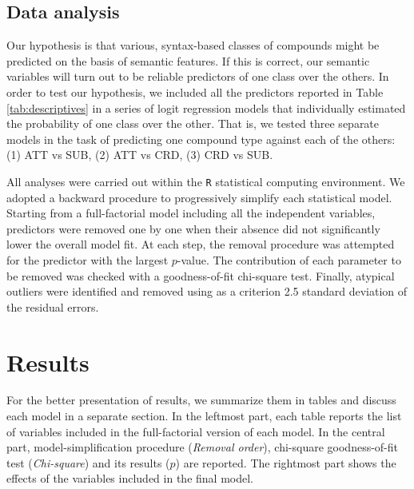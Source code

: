 \documentclass[output=paper]{langsci/langscibook}
\begin{document}
\subsection{Data analysis}


Our hypothesis is that various, syntax-based classes of compounds might be predicted on the basis of semantic features. If this is correct, our semantic variables will turn out to be reliable predictors of one class over the others. In order to test our hypothesis, we included all the predictors reported in Table \ref{tab:descriptives} in a series of logit regression models that individually estimated the probability of one class over the other. That is, we tested three separate models in the task of predicting one compound type against each of the others: (1) ATT vs SUB, (2) ATT vs CRD, (3) CRD vs SUB.

All analyses were carried out within the \texttt{R} statistical computing environment. We adopted a backward procedure to progressively simplify each statistical mod\-el. Starting from a full-factorial model including all the independent variables, predictors were removed one by one when their absence did not significantly lower the overall model fit. At each step, the removal procedure was attempted for the predictor with the largest $p$-value. The contribution of each parameter to be removed was checked with a goodness-of-fit chi-square test. Finally, atypical outliers were identified and removed using as a criterion 2.5 standard deviation of the residual errors.


\section{Results}
\label{sec:results}


For the better presentation of results, we summarize them in tables and discuss each model in a separate section. In the leftmost part, each table reports the list of variables included in the full-factorial version of each model. In the central part, model-simplification procedure (\emph{Removal order}), chi-square goodness-of-fit test (\emph{Chi-square}) and its results ($p$) are reported. The rightmost part shows the effects of the variables included in the final model.
\end{document}
